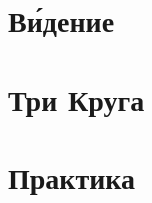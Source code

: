 \documentclass[t,aspectratio=169,14pt]{beamer}  %
\begin{document}
\section{В\'{и}дение}
\begin{frame}[c]
	\frametitle{\insertsection}
	\framesubtitle{\insertsubsection}

\end{frame}
\section{Три Круга}
\begin{frame}[c]
	\frametitle{\insertsection}
	\framesubtitle{\insertsubsection}

\end{frame}
\section{Практика}
\begin{frame}[c]
\frametitle{\insertsection}

\end{frame}
\end{document}
